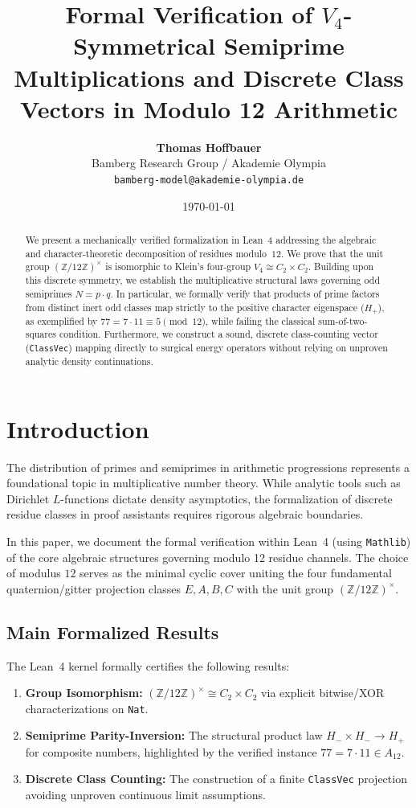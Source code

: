 \documentclass[11pt,a4paper]{article}
\title{\textbf{Formal Verification of $V_4$-Symmetrical Semiprime Multiplications and Discrete Class Vectors in Modulo 12 Arithmetic}}
\author{\textbf{Thomas Hoffbauer}\\
	\small Bamberg Research Group / Akademie Olympia\\
	\small \texttt{bamberg-model@akademie-olympia.de}}
\date{\today}
\theoremstyle{definition}
\begin{document}
	
	\maketitle
	
	\begin{abstract}
		We present a mechanically verified formalization in Lean~4 addressing the algebraic and character-theoretic decomposition of residues modulo~$12$. We prove that the unit group $(\mathbb{Z}/12\mathbb{Z})^\times$ is isomorphic to Klein's four-group $V_4 \cong C_2 \times C_2$. Building upon this discrete symmetry, we establish the multiplicative structural laws governing odd semiprimes $N = p \cdot q$. In particular, we formally verify that products of prime factors from distinct inert odd classes map strictly to the positive character eigenspace ($H_+$), as exemplified by $77 = 7 \cdot 11 \equiv 5 \pmod{12}$, while failing the classical sum-of-two-squares condition. Furthermore, we construct a sound, discrete class-counting vector (\texttt{ClassVec}) mapping directly to surgical energy operators without relying on unproven analytic density continuations.
	\end{abstract}
	
	\section{Introduction}
	
	The distribution of primes and semiprimes in arithmetic progressions represents a foundational topic in multiplicative number theory. While analytic tools such as Dirichlet $L$-functions dictate density asymptotics, the formalization of discrete residue classes in proof assistants requires rigorous algebraic boundaries.
	
	In this paper, we document the formal verification within Lean~4 (using \texttt{Mathlib}) of the core algebraic structures governing modulo 12 residue channels. The choice of modulus $12$ serves as the minimal cyclic cover uniting the four fundamental quaternion/gitter projection classes $E, A, B, C$ with the unit group $(\mathbb{Z}/12\mathbb{Z})^\times$.
	
	\subsection{Main Formalized Results}
	The Lean~4 kernel formally certifies the following results:
	\begin{enumerate}
		\item \textbf{Group Isomorphism:} $(\mathbb{Z}/12\mathbb{Z})^\times \cong C_2 \times C_2$ via explicit bitwise/XOR characterizations on \texttt{Nat}.
		\item \textbf{Semiprime Parity-Inversion:} The structural product law $H_- \times H_- \to H_+$ for composite numbers, highlighted by the verified instance $77 = 7 \cdot 11 \in A_{12}$.
		\item \textbf{Discrete Class Counting:} The construction of a finite \texttt{ClassVec} projection avoiding unproven continuous limit assumptions.
	\end{enumerate}
	
\end{document}
